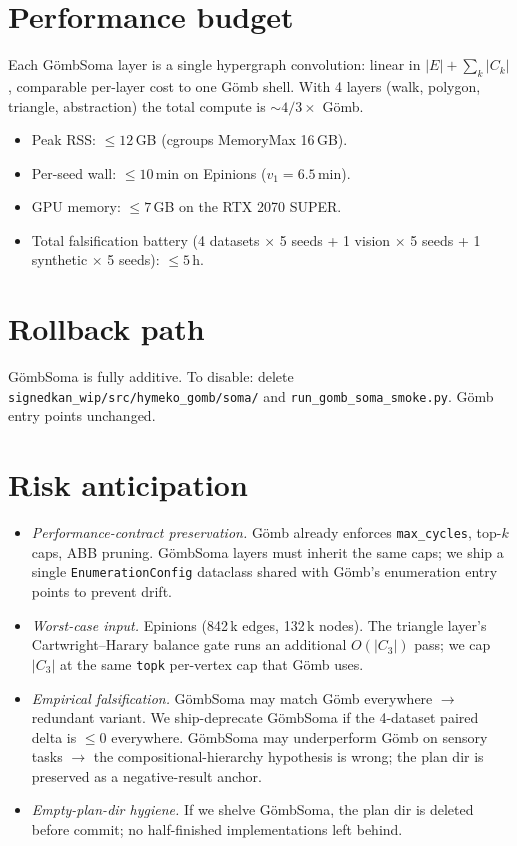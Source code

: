 \documentclass[11pt,a4paper]{article}
\newcommand{\Gomb}{G\"omb}
\newcommand{\Soma}{G\"ombSoma}
\begin{document}
\section{Performance budget}

Each \Soma{} layer is a single hypergraph convolution: linear in
$|E| + \sum_k |C_k|$, comparable per-layer cost to one \Gomb{} shell.
With 4 layers (walk, polygon, triangle, abstraction) the total
compute is $\sim 4/3 \times$ \Gomb.
\begin{itemize}
\item Peak RSS: $\leq 12$\,GB (cgroups MemoryMax 16\,GB).
\item Per-seed wall: $\leq 10$\,min on Epinions ($v_1 = 6.5$\,min).
\item GPU memory: $\leq 7$\,GB on the RTX 2070 SUPER.
\item Total falsification battery (4 datasets $\times$ 5 seeds + 1 vision
  $\times$ 5 seeds + 1 synthetic $\times$ 5 seeds): $\leq 5$\,h.
\end{itemize}

\section{Rollback path}

\Soma{} is fully additive. To disable: delete
\texttt{signedkan\_wip/src/hymeko\_gomb/soma/} and
\texttt{run\_gomb\_soma\_smoke.py}. \Gomb{} entry points unchanged.

\section{Risk anticipation}

\begin{itemize}
\item \emph{Performance-contract preservation.} \Gomb{} already enforces \texttt{max\_cycles}, top-$k$ caps, ABB pruning. \Soma{} layers must inherit the same caps; we ship a single \texttt{EnumerationConfig} dataclass shared with \Gomb's enumeration entry points to prevent drift.
\item \emph{Worst-case input.} Epinions (842\,k edges, 132\,k nodes). The triangle layer's Cartwright--Harary balance gate runs an additional $O(|C_3|)$ pass; we cap $|C_3|$ at the same \texttt{topk} per-vertex cap that \Gomb{} uses.
\item \emph{Empirical falsification.} \Soma{} may match \Gomb{} everywhere $\to$ redundant variant. We ship-deprecate \Soma{} if the 4-dataset paired delta is $\leq 0$ everywhere. \Soma{} may underperform \Gomb{} on sensory tasks $\to$ the compositional-hierarchy hypothesis is wrong; the plan dir is preserved as a negative-result anchor.
\item \emph{Empty-plan-dir hygiene.} If we shelve \Soma, the plan dir is deleted before commit; no half-finished implementations left behind.
\end{itemize}
\end{document}
